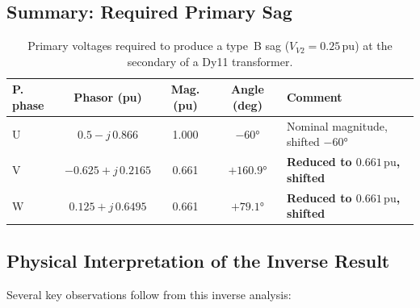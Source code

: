 \documentclass[a4paper,11pt]{article}
\begin{document}
\subsection{Summary: Required Primary Sag}

\begin{table}[h!]
\centering
\caption{Primary voltages required to produce a type~B sag
         ($V_{V2}{=}0.25\,\mathrm{pu}$) at the secondary of a Dy11
         transformer.}
\label{tab:inv_results}
\begin{tabular}{lcccl}
\toprule
\textbf{P. phase} & \textbf{Phasor (pu)} & \textbf{Mag. (pu)}
   & \textbf{Angle (deg)} & \textbf{Comment} \\
\midrule
U & $0.5 - j\,0.866$ & 1.000 & $-60°$  & Nominal magnitude, shifted $-60°$ \\
V & $-0.625 + j\,0.2165$ & 0.661 & $+160.9°$ & \textbf{Reduced to $0.661\,\mathrm{pu}$, shifted} \\
W & $0.125 + j\,0.6495$ & 0.661 & $+79.1°$  & \textbf{Reduced to $0.661\,\mathrm{pu}$, shifted} \\
\bottomrule
\end{tabular}
\end{table}

\subsection{Physical Interpretation of the Inverse Result}

Several key observations follow from this inverse analysis:
\end{document}
